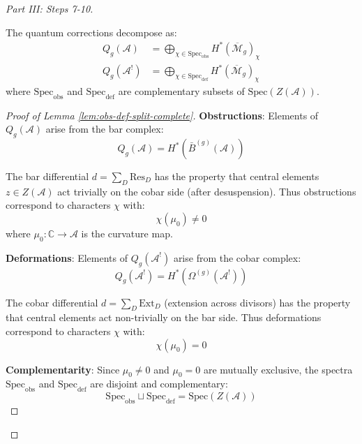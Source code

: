 \begin{proof}[Part III: Steps 7-10]
\begin{lemma}
\label{lem:obs-def-split-complete}
The quantum corrections decompose as:
\begin{align}
Q_g(\mathcal{A}) &= \bigoplus_{\chi \in \text{Spec}_{\text{obs}}} H^*(\overline{
\mathcal{M}}_g)_\chi\\
Q_g(\mathcal{A}^!) &= \bigoplus_{\chi \in \text{Spec}_{\text{def}}} H^*(\overline{
\mathcal{M}}_g)_\chi
\end{align}
where $\text{Spec}_{\text{obs}}$ and $\text{Spec}_{\text{def}}$ are complementary 
subsets of $\text{Spec}(Z(\mathcal{A}))$.
\end{lemma}

\begin{proof}[Proof of Lemma \ref{lem:obs-def-split-complete}]
\textbf{Obstructions}: Elements of $Q_g(\mathcal{A})$ arise from the bar complex:
\begin{equation}
Q_g(\mathcal{A}) = H^*(\bar{B}^{(g)}(\mathcal{A}))
\end{equation}

The bar differential $d = \sum_{D} \text{Res}_D$ has the property that central elements 
$z \in Z(\mathcal{A})$ act trivially on the cobar side (after desuspension). Thus 
obstructions correspond to characters $\chi$ with:
\begin{equation}
\chi(\mu_0) \neq 0
\end{equation}
where $\mu_0: \mathbb{C} \to \mathcal{A}$ is the curvature map.

\textbf{Deformations}: Elements of $Q_g(\mathcal{A}^!)$ arise from the cobar complex:
\begin{equation}
Q_g(\mathcal{A}^!) = H^*(\Omega^{(g)}(\mathcal{A}^!))
\end{equation}

The cobar differential $d = \sum_{D} \text{Ext}_D$ (extension across divisors) has the 
property that central elements act non-trivially on the bar side. Thus deformations 
correspond to characters $\chi$ with:
\begin{equation}
\chi(\mu_0) = 0
\end{equation}

\textbf{Complementarity}: Since $\mu_0 \neq 0$ and $\mu_0 = 0$ are mutually exclusive, 
the spectra $\text{Spec}_{\text{obs}}$ and $\text{Spec}_{\text{def}}$ are disjoint and 
complementary:
\begin{equation}
\text{Spec}_{\text{obs}} \sqcup \text{Spec}_{\text{def}} = \text{Spec}(Z(\mathcal{A}))
\end{equation}
\end{proof}


\end{proof}
